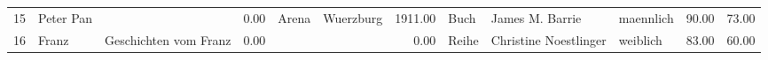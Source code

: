 \begin{table}
\begin{center}
{\begin{tabular}{rllrllrlllrr}
  15 & Peter Pan                                                                                                                                                                                                                                                       &                                                                                                                                                                                                                                                                 & 0.00 & Arena                                                                                                                                                                                                                                                           & Wuerzburg                                                                                                                                                                                                                                                       & 1911.00 & Buch & James M. Barrie                                                                                                                                                                                                                                                 & maennlich & 90.00 & 73.00 \\ 
  16 & Franz                                                                                                                                                                                                                                                           & Geschichten vom Franz                                                                                                                                                                                                                                           & 0.00 &                                                                                                                                                                                                                                                                 &                                                                                                                                                                                                                                                                 & 0.00 & Reihe & Christine Noestlinger                                                                                                                                                                                                                                           & weiblich & 83.00 & 60.00 \\ 

\end{tabular}}
\end{center}
\end{table}
